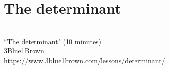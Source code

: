 \section{The determinant}
\begin{bookfigure}
   \\
  ``The determinant" (10 minutes) \\
  \footnotesize 3Blue1Brown \\
  \url{https://www.3blue1brown.com/lessons/determinant/}
\end{bookfigure}
